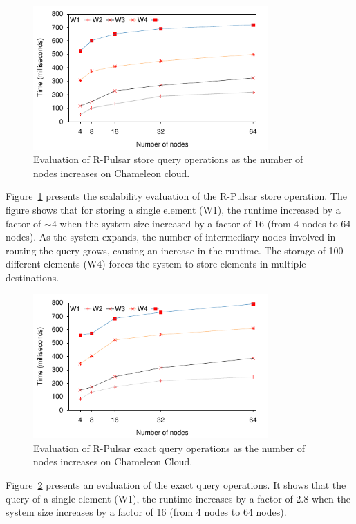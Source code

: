 \begin{figure}[h!]
  \centering
  \includegraphics[width=0.8\textwidth]{Results/ProducerLine.pdf}
  \caption{Evaluation of R-Pulsar store query operations as the number of nodes increases on Chameleon cloud.}
  \label{fig:ProducerLine}
\end{figure}

Figure~\ref{fig:ProducerLine} presents the scalability evaluation of the R-Pulsar store operation. The figure shows that for storing a single element (W1), the runtime increased by a factor of $\sim$4 when the system size increased by a factor of 16 (from 4 nodes to 64 nodes). As the system expands, the number of intermediary nodes involved in routing the query grows, causing an increase in the runtime. The storage of 100 different elements (W4) forces the system to store elements in multiple destinations.

\begin{figure}[h!]
  \centering
  \includegraphics[width=0.8\textwidth]{Results/ProducerLineEx.pdf}
  \caption{Evaluation of R-Pulsar exact query operations as the number of nodes increases on Chameleon Cloud.}
  \label{fig:ProducerLineEx}
\end{figure}

Figure~\ref{fig:ProducerLineEx} presents an evaluation of the exact query operations. It shows that the query of a single element (W1), the runtime increases by a factor of 2.8 when the system size increases by a factor of 16 (from 4 nodes to 64 nodes).

